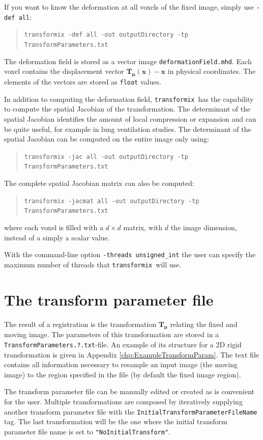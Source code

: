 \documentclass[]{report}
\newcommand{\transformix}{\texttt{transformix}}
\newcommand{\vx}{\bm{x}}
\newcommand{\vmu}{\bm{\mu}}
\newcommand{\vTm}{\bm{T}_{\vmu}}
\newcommand{\vTmx}{\bm{T}_{\vmu}(\bm{x})}
\begin{document}
If you want to know the deformation at all voxels of the fixed
image, simply use \texttt{-def all}:
\begin{quote}
\texttt{transformix -def all -out outputDirectory -tp
TransformParameters.txt}
\end{quote}
The deformation field is stored as a vector image
\texttt{deformationField.mhd}. Each voxel contains the
displacement vector $\vTmx-\vx$ in physical coordinates. The
elements of the vectors are stored as \texttt{float} values.

In addition to computing the deformation field, \transformix\ has
the capability to compute the spatial Jacobian of the
transformation. The determinant of the spatial Jacobian identifies
the amount of local compression or expansion and can be quite
useful, for example in lung ventilation studies. The determinant of
the spatial Jacobian can be computed on the entire image only using:
\begin{quote}
\texttt{transformix -jac all -out outputDirectory -tp
TransformParameters.txt}
\end{quote}
The complete spatial Jacobian matrix can also be computed:
\begin{quote}
\texttt{transformix -jacmat all -out outputDirectory -tp
TransformParameters.txt}
\end{quote}
where each voxel is filled with a $d \times d$ matrix, with $d$ the
image dimension, instead of a simply a scalar value.

With the command-line option \texttt{-threads unsigned\_int} the
user can specify the maximum number of threads that \transformix\
will use.

\section{The transform parameter file}\label{sec:transformix:tp}

The result of a registration is the transformation $\vTm$ relating
the fixed and moving image. The parameters of this transformation
are stored in a \texttt{TransformParameters.?.txt}-file. An
example of its structure for a 2D rigid transformation is given in
Appendix \ref{chp:ExampleTransformParam}. The text file contains
all information necessary to resample an input image (the moving
image) to the region specified in the file (by default the fixed
image region).

The transform parameter file can be manually edited or created as
is convenient for the user. Multiple transformations are composed
by iteratively supplying another transform parameter file with the
\texttt{InitialTransformParameterFileName} tag. The last
transformation will be the one where the initial transform
parameter file name is set to \texttt{"NoInitialTransform"}.
\end{document}
